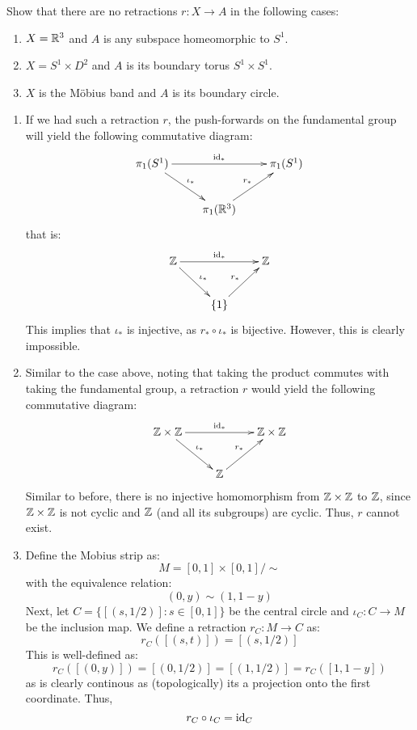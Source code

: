 \documentclass[12pt]{article}
\begin{document}
\begin{problab}{3}
    Show that there are no retractions $r \colon X \to A$ in the following cases:
    \begin{enumerate}
    \item $X = \mathbb R^3$ and $A$ is any subspace homeomorphic to $S^1$.
    \item $X = S^1 \times D^2$ and $A$ is its boundary torus $S^1 \times S^1$.
    \item $X$ is the M{\" o}bius band and $A$ is its boundary circle.
    \end{enumerate}
\end{problab}
\begin{solu}
    \bbni
    \begin{enumerate}
        \item If we had such a retraction $r$, the push-forwards on the fundamental group will yield the following commutative diagram:
        \[ \xymatrix{ \pi_1(S^1) \ar[rr]^{\id_*} \ar[rd]^{\iota_*} & & \pi_1(S^1) \\ 
        & \pi_1(\R^3) \ar[ur]^{r_*}} \]
        that is:
        \[ \xymatrix{ \Z \ar[rr]^{\id_*} \ar[rd]^{\iota_*} & & \Z \\ 
        & \{1\} \ar[ur]^{r_*}} \]
        This implies that $\iota_*$ is injective, as $r_* \circ \iota_*$ is bijective. However, this is clearly impossible.
        \item Similar to the case above, noting that taking the product commutes with taking the fundamental group, a retraction $r$ would yield the following commutative diagram:
        \[ \xymatrix{ \Z \times \Z \ar[rr]^{\id_*} \ar[rd]^{\iota_*} & & \Z \times \Z\\ 
        & \Z \ar[ur]^{r_*}} \]       
        Similar to before, there is no injective homomorphism from $\mathbb Z \times \mathbb Z$ to $\mathbb Z$, since $\mathbb Z \times \mathbb Z$ is not cyclic and $\mathbb Z$ (and all its subgroups) are cyclic. Thus, $r$ cannot exist.
        \item Define the Mobius strip as:
        \[ M = [0,1] \times [0, 1] / \sim\]
        with the equivalence relation:
        \[ (0, y) \sim (1, 1-y)\]
        Next, let $C = \{[(s, 1/2)]: s\in [0, 1]\}$ be the central circle and $\iota_C: C \to M$ be the inclusion map. We define a retraction $r_C: M \to C$ as:
        \[r_C( [(s, t)]) = [(s, 1/2)]\]
        This is well-defined as: 
        \[r_C([(0, y)]) = [(0, 1/2)] = [(1, 1/2)] = r_C([1, 1-y])\]
        as is clearly continous as (topologically) its a projection onto the first coordinate. Thus,
        \[r_C \circ \iota_C = \operatorname{id}_C \]

\end{enumerate}
\end{solu}
\end{document}
